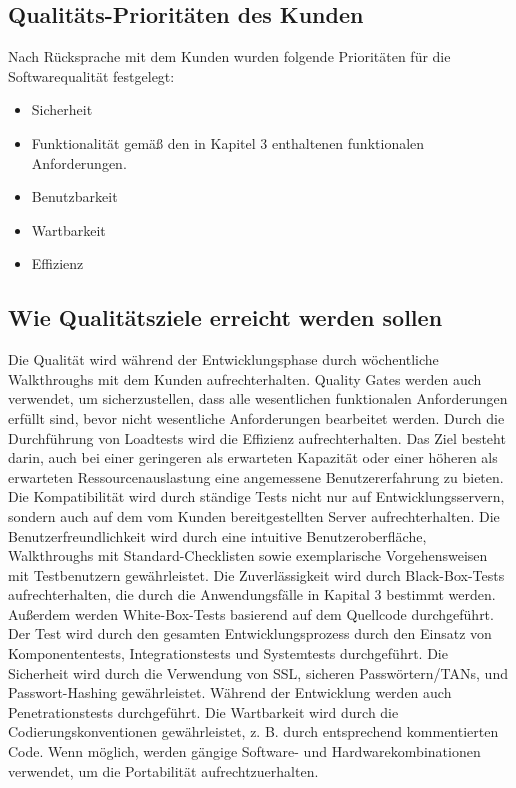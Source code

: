 	\subsection{Qualitäts-Prioritäten des Kunden}
		
    Nach Rücksprache mit dem Kunden wurden folgende Prioritäten für die Softwarequalität festgelegt:

		\begin{itemize}
			\item Sicherheit 
            \item Funktionalität gemäß den in Kapitel 3 enthaltenen funktionalen Anforderungen.
           	\item Benutzbarkeit
            \item Wartbarkeit
            \item Effizienz

		\end{itemize}

	\subsection{Wie Qualitätsziele erreicht werden sollen}
	
	Die Qualität wird während der Entwicklungsphase durch wöchentliche Walkthroughs mit dem Kunden aufrechterhalten. Quality Gates werden auch verwendet, um sicherzustellen, dass alle wesentlichen funktionalen Anforderungen erfüllt sind, bevor nicht wesentliche Anforderungen bearbeitet werden.
	\linebreak
	Durch die Durchführung von Loadtests wird die Effizienz aufrechterhalten. Das Ziel besteht darin, auch bei einer geringeren als erwarteten Kapazität oder einer höheren als erwarteten Ressourcenauslastung eine angemessene Benutzererfahrung zu bieten.
	\linebreak
	Die Kompatibilität wird durch ständige Tests nicht nur auf Entwicklungsservern, sondern auch auf dem vom Kunden bereitgestellten Server aufrechterhalten.
	\linebreak
	Die Benutzerfreundlichkeit wird durch eine intuitive Benutzeroberfläche, Walkthroughs mit Standard-Checklisten sowie exemplarische Vorgehensweisen mit Testbenutzern gewährleistet.
	\linebreak
	Die Zuverlässigkeit wird durch Black-Box-Tests aufrechterhalten, die durch die Anwendungsfälle in Kapital 3 bestimmt werden. Außerdem werden White-Box-Tests basierend auf dem Quellcode durchgeführt. Der Test wird durch den gesamten Entwicklungsprozess durch den Einsatz von Komponententests, Integrationstests und Systemtests durchgeführt.
	\linebreak
	Die Sicherheit wird durch die Verwendung von SSL, sicheren Passwörtern/TANs, und Passwort-Hashing gewährleistet. Während der Entwicklung werden auch Penetrationstests durchgeführt.
	\linebreak
	Die Wartbarkeit wird durch die Codierungskonventionen gewährleistet, z. B. durch entsprechend kommentierten Code.
	\linebreak
	Wenn möglich, werden gängige Software- und Hardwarekombinationen verwendet, um die Portabilität aufrechtzuerhalten.
